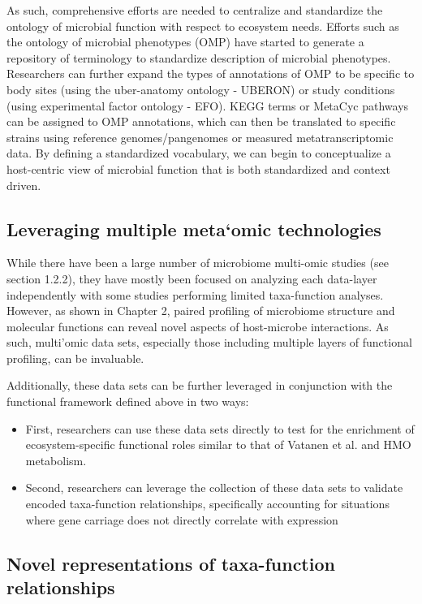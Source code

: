 As such, comprehensive efforts are needed to centralize and standardize the ontology of microbial function with respect to ecosystem needs. Efforts such as the ontology of microbial phenotypes (OMP) \cite{chibucos2014ontology} have started to generate a repository of terminology to standardize description of microbial phenotypes. Researchers can further expand the types of annotations of OMP to be specific to body sites (using the uber-anatomy ontology - UBERON) or study conditions (using experimental factor ontology - EFO). KEGG terms or MetaCyc pathways can be assigned to OMP annotations, which can then be translated to specific strains using reference genomes/pangenomes or measured metatranscriptomic data. By defining a standardized vocabulary, we can begin to conceptualize a host-centric view of microbial function that is both standardized and context driven. 

\subsection{Leveraging multiple meta`omic technologies}

While there have been a large number of microbiome multi-omic studies (see section 1.2.2), they have mostly been focused on analyzing each data-layer independently with some studies performing limited taxa-function analyses. However, as shown in Chapter 2, paired profiling of microbiome structure and molecular functions can reveal novel aspects of host-microbe interactions. As such, multi'omic data sets, especially those including multiple layers of functional profiling, can be invaluable. 

Additionally, these data sets can be further leveraged in conjunction with the functional framework defined above in two ways: 

\begin{itemize}
    \item First, researchers can use these data sets directly to test for the enrichment of ecosystem-specific functional roles similar to that of Vatanen et al. \cite{vatanen2018human} and HMO metabolism. 
    \item Second, researchers can leverage the collection of these data sets to validate encoded taxa-function relationships, specifically accounting for situations where gene carriage does not directly correlate with expression \cite{franzosa2014relating}
\end{itemize}

\subsection{Novel representations of taxa-function relationships}

